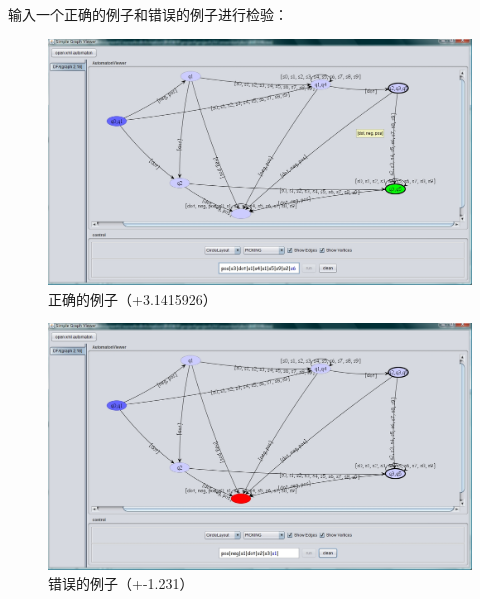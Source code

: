\documentclass[12pt,a4paper]{article}
\begin{document}
\begin{CJK}{UTF8}{song}
    输入一个正确的例子和错误的例子进行检验：
    \begin{figure}[htbp]
    \centering
    \includegraphics[scale=.3]{correct}
    \caption{正确的例子（+3.1415926）}
    \label{fig:correct}
    \end{figure}
    \begin{figure}[htbp]
    \centering
    \includegraphics[scale=.3]{error}
    \caption{错误的例子（+-1.231）}
    \label{fig:error}
    \end{figure}
    
    


\end{CJK}
\end{document}

